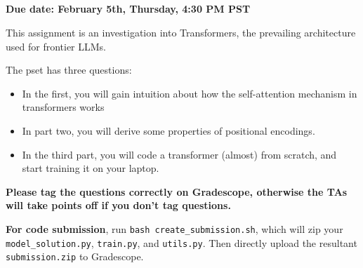 \documentclass[answers]{exam}
\title{
\textmd{\textbf{\hmwkClass\ \hmwkTitle}}
}
\author{}
\date{}
\begin{document}
\vspace{-1in}

\maketitle

\vspace{-0.5in}


\textbf{Due date: February 5th, Thursday, 4:30 PM PST}

This assignment is an investigation into Transformers,
the prevailing architecture used for 
frontier LLMs.

The pset has three questions:

\begin{itemize}
    \item In the first, you will gain 
    intuition about how the self-attention 
    mechanism in transformers works
    \item In part two, you will derive 
    some properties of positional encodings.
    \item In the third part, you will 
    code a transformer (almost) from scratch,
    and start training it on your laptop.
\end{itemize}

\textbf{Please tag the questions correctly on Gradescope, otherwise the TAs will take points off if you don't tag questions.}

\vspace{15pt}

\textbf{For code submission}, run \texttt{bash create\_submission.sh}, which will zip your \texttt{model\_solution.py}, \texttt{train.py}, and \texttt{utils.py}. Then directly upload the resultant \texttt{submission.zip} to Gradescope.


%
\end{document}
